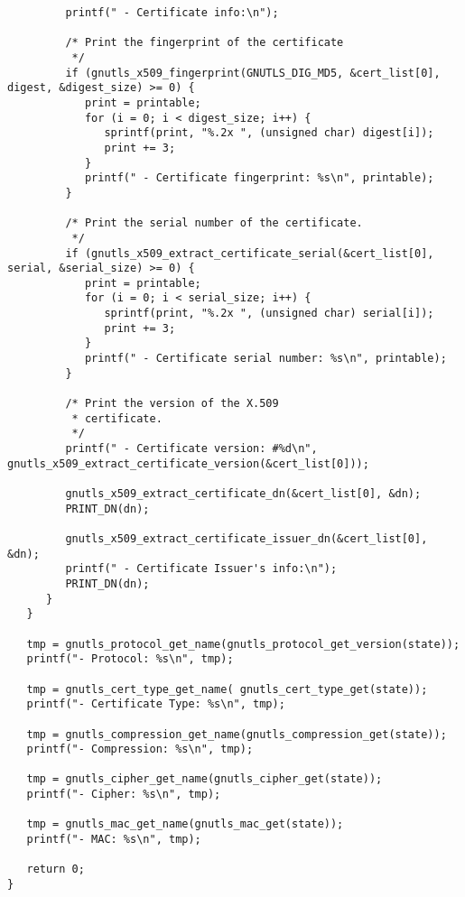\begin{verbatim}
         printf(" - Certificate info:\n");

         /* Print the fingerprint of the certificate
          */
         if (gnutls_x509_fingerprint(GNUTLS_DIG_MD5, &cert_list[0], digest, &digest_size) >= 0) {
            print = printable;
            for (i = 0; i < digest_size; i++) {
               sprintf(print, "%.2x ", (unsigned char) digest[i]);
               print += 3;
            }
            printf(" - Certificate fingerprint: %s\n", printable);
         }

         /* Print the serial number of the certificate.
          */
         if (gnutls_x509_extract_certificate_serial(&cert_list[0], serial, &serial_size) >= 0) {
            print = printable;
            for (i = 0; i < serial_size; i++) {
               sprintf(print, "%.2x ", (unsigned char) serial[i]);
               print += 3;
            }
            printf(" - Certificate serial number: %s\n", printable);
         }

         /* Print the version of the X.509 
          * certificate.
          */
         printf(" - Certificate version: #%d\n", gnutls_x509_extract_certificate_version(&cert_list[0]));

         gnutls_x509_extract_certificate_dn(&cert_list[0], &dn);
         PRINT_DN(dn);

         gnutls_x509_extract_certificate_issuer_dn(&cert_list[0], &dn);
         printf(" - Certificate Issuer's info:\n");
         PRINT_DN(dn);
      }
   }

   tmp = gnutls_protocol_get_name(gnutls_protocol_get_version(state));
   printf("- Protocol: %s\n", tmp);

   tmp = gnutls_cert_type_get_name( gnutls_cert_type_get(state));
   printf("- Certificate Type: %s\n", tmp);

   tmp = gnutls_compression_get_name(gnutls_compression_get(state));
   printf("- Compression: %s\n", tmp);

   tmp = gnutls_cipher_get_name(gnutls_cipher_get(state));
   printf("- Cipher: %s\n", tmp);

   tmp = gnutls_mac_get_name(gnutls_mac_get(state));
   printf("- MAC: %s\n", tmp);

   return 0;
}

\end{verbatim}

